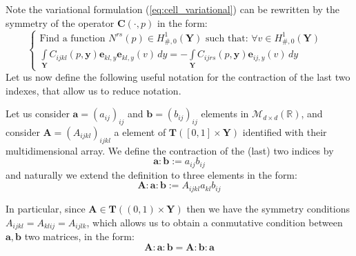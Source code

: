 Note the variational formulation (\ref{eq:cell_variational}) can be rewritten by the symmetry of the operator $\mathbf{C}(\cdot,p)$ in the form:
\begin{equation}
    \label{eq:cell_symmetric}
    \left \{
    \begin{array}{cc}
        \text{Find a function } N^{rs}(p) \in H^1_{\#,0}(\mathbf{Y}) \text{ such that: } \forall v \in H^1_{\#, 0}(\mathbf{Y})&\\
        \int\limits_{\mathbf{Y}} C_{ijkl}(p,\mathbf{y})\mathbf{e}_{kl,y} \mathbf{e}_{kl,y}(v)\,dy = -\int\limits_{\mathbf{Y}} C_{ijrs}(p,\mathbf{y}) \mathbf{e}_{ij,y}(v)\,dy & 
    \end{array}
    \right.
\end{equation}
Let us now define the following useful notation for the contraction of the last two indexes, that allow us to reduce notation.
\begin{defn}
Let us consider $\mathbf{a} = (a_{ij})_{ij}$ and $\mathbf{b} = (b_{ij})_{ij}$ elements in $\mathcal{M}_{d\times d}(\mathbb{R})$, and consider $\mathbf{A}=(A_{ijkl})_{ijkl}$ a element of $\mathbf{T}([0,1]\times \mathbf{Y})$ identified with their multidimensional array. We define the contraction of the (last) two indices by
\begin{equation*}
    \mathbf{a}:\mathbf{b} := a_{ij}b_{ij}
\end{equation*}
and naturally we extend the definition to three elements in the form:
\begin{equation*}
    \mathbf{A}:\mathbf{a}:\mathbf{b} := A_{ijkl}a_{kl}b_{ij}
\end{equation*}
\end{defn}
\begin{rem}
In particular, since $\mathbf{A} \in \mathbf{T}((0,1)\times \mathbf{Y})$ then we have the symmetry conditions $A_{ijkl}=A_{klij}=A_{ijlk}$, which allows us to obtain a conmutative condition between $\mathbf{a},\mathbf{b}$ two matrices, in the form:
\begin{equation}
    \mathbf{A}: \mathbf{a}:\mathbf{b}= \mathbf{A}:\mathbf{b}:\mathbf{a}
\end{equation}
\end{rem}

